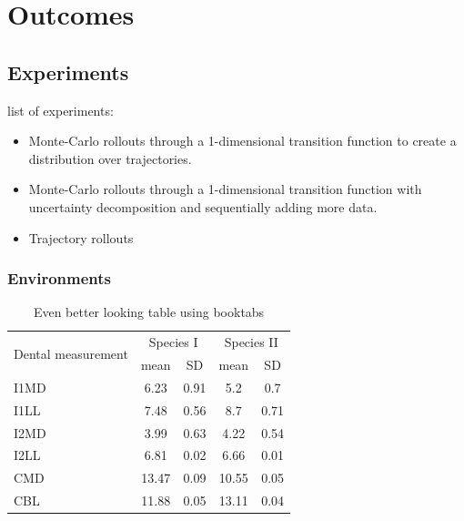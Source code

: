 \chapter{Outcomes}

\ifpdf
    \graphicspath{{Chapter3/Figs/Raster/}{Chapter3/Figs/PDF/}{Chapter3/Figs/}}
\else
    \graphicspath{{Chapter3/Figs/Vector/}{Chapter3/Figures/}}
\fi

\section{Experiments}
list of experiments:
\begin{itemize}
    \item Monte-Carlo rollouts through a 1-dimensional transition function to create a distribution over trajectories.
    \item Monte-Carlo rollouts through a 1-dimensional transition function with uncertainty decomposition and sequentially adding more data.
    \item Trajectory rollouts 
\end{itemize}
\subsection{Environments}

\begin{table}
\caption{Even better looking table using booktabs}
\centering
\label{table:good_table}
\begin{tabular}{l c c c c}
\toprule
\multirow{2}{*}{Dental measurement} & \multicolumn{2}{c}{Species I} & \multicolumn{2}{c}{Species II} \\ 
\cmidrule{2-5}
  & mean & SD  & mean & SD  \\ 
\midrule
I1MD & 6.23 & 0.91 & 5.2  & 0.7  \\

I1LL & 7.48 & 0.56 & 8.7  & 0.71 \\

I2MD & 3.99 & 0.63 & 4.22 & 0.54 \\

I2LL & 6.81 & 0.02 & 6.66 & 0.01 \\

CMD & 13.47 & 0.09 & 10.55 & 0.05 \\

CBL & 11.88 & 0.05 & 13.11 & 0.04\\ 
\bottomrule
\end{tabular}
\end{table}

